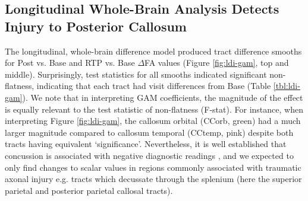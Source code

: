 \documentclass[12pt]{article}
\begin{document}
\subsection{Longitudinal Whole-Brain Analysis Detects Injury to Posterior Callosum}
\label{ssec:res-dwi-wba}
The longitudinal, whole-brain difference model produced tract difference smooths for Post vs. Base and RTP vs. Base $\Delta$FA values (Figure \ref{fig:ldi-gam}, top and middle). Surprisingly, test statistics for all smooths indicated significant non-flatness, indicating that each tract had visit differences from Base (Table \ref{tbl:ldi-gam}). We note that in interpreting GAM coefficients, the magnitude of the effect is equally relevant to the test statistic of non-flatness (F-stat). For instance, when interpreting Figure \ref{fig:ldi-gam}, the callosum orbital (CCorb, green) had a much larger magnitude compared to callosum temporal (CCtemp, pink) despite both tracts having equivalent `significance'. Nevertheless, it is well established that concussion is associated with negative diagnostic readings \parencite[e.g.][]{klein2019PrevalencePotentiallyClinically}, and we expected to only find changes to scalar values in regions commonly associated with traumatic axonal injury e.g. tracts which decussate through the splenium (here the superior parietal and posterior parietal callosal tracts).
\end{document}
